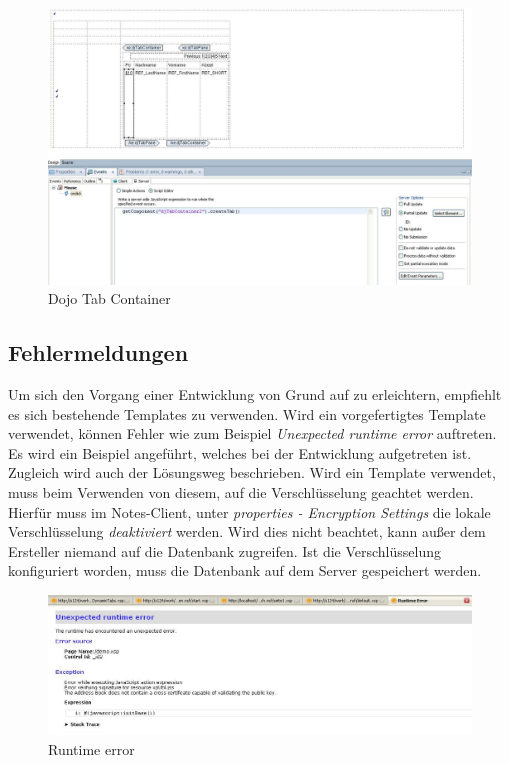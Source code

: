 \begin{figure}[H]
    \centerline{\includegraphics[scale=0.4]{pics/dojoContainer}}
    \caption[Dojo Container ]{\label{FiG:Dojo Container}
	Dojo Tab Container}
\end{figure} 



\subsection{Fehlermeldungen}
\label{sec:6template}

Um sich den Vorgang einer Entwicklung von Grund auf zu erleichtern, empfiehlt es sich bestehende Templates zu verwenden.
Wird ein vorgefertigtes Template verwendet, können Fehler wie zum Beispiel \textit{Unexpected runtime error} auftreten.
\newline
Es wird ein Beispiel angeführt, welches bei der Entwicklung aufgetreten ist. Zugleich wird auch der Lösungsweg beschrieben.
Wird ein Template verwendet, muss beim Verwenden von \linebreak diesem, auf die Verschlüsselung geachtet werden. Hierfür muss im Notes-Client, unter
\textit{\linebreak properties - Encryption Settings} die lokale Verschlüsselung \textit{deaktiviert} werden. Wird dies nicht beachtet, kann außer dem Ersteller 
niemand auf die Datenbank zugreifen. Ist die \linebreak Verschlüsselung konfiguriert worden, muss die Datenbank auf dem Server
gespeichert werden.
\vspace{0.5cm}
\begin{figure}[H]
    \centerline{\includegraphics[scale=0.4]{pics/runtimeError}}
    \caption[Fehlermeldung - Unexpected runtime error]{\label{FiG:Unexpected-Runtime-Error }
	Runtime error }
\end{figure} 

